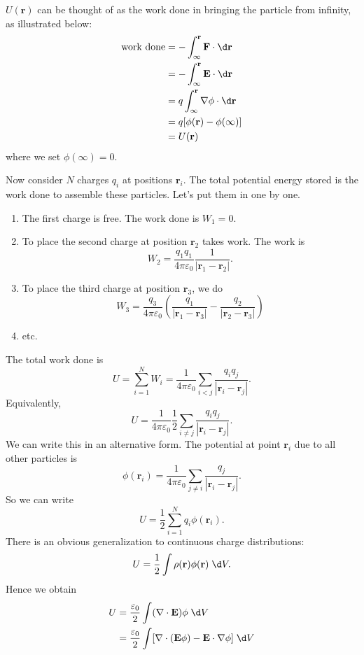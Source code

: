 \documentclass[a4paper]{article}
\begin{document}
$U(\mathbf{r})$ can be thought of as the work done in bringing the particle from infinity, as illustrated below:
\begin{align*}
  \text{work done} &= -\int_\infty^\mathbf{r} \mathbf{F}\cdot \d \mathbf{r}\\
  &= -\int_\infty^\mathbf{r}\mathbf{E}\cdot \d \mathbf{r} \\
  &= q\int_\infty^\mathbf{r} \nabla \mathbf{\phi}\cdot \d \mathbf{r}\\
  &= q[\phi(\mathbf{r}) - \phi(\infty)]\\
  &= U(\mathbf{r})
\end{align*}
where we set $\phi(\infty) = 0$.

Now consider $N$ charges $q_i$ at positions $\mathbf{r}_i$. The total potential energy stored is the work done to assemble these particles. Let's put them in one by one.
\begin{enumerate}
  \item The first charge is free. The work done is $W_1 = 0$.
  \item To place the second charge at position $\mathbf{r}_2$ takes work. The work is
    \[
      W_2 = \frac{q_1q_1}{4\pi\varepsilon_0}\frac{1}{|\mathbf{r}_1 - \mathbf{r}_2|}.
    \]
  \item To place the third charge at position $\mathbf{r}_3$, we do
    \[
      W_3 = \frac{q_3}{4\pi\varepsilon_0}\left(\frac{q_1}{|\mathbf{r}_1 - \mathbf{r}_3|} - \frac{q_2}{|\mathbf{r}_2 - \mathbf{r}_3|}\right)
    \]
  \item etc.
\end{enumerate}
The total work done is
\[
  U = \sum_{i = 1}^N W_i = \frac{1}{4\pi\varepsilon_0} \sum_{i < j} \frac{q_iq_j}{|\mathbf{r}_i - \mathbf{r}_j|}.
\]
Equivalently,
\[
  U = \frac{1}{4\pi\varepsilon_0} \frac{1}{2} \sum_{i \not= j} \frac{q_iq_j}{|\mathbf{r}_i - \mathbf{r}_j|}.
\]
We can write this in an alternative form. The potential at point $\mathbf{r}_i$ due to all other particles is
\[
  \phi(\mathbf{r}_i) = \frac{1}{4\pi\varepsilon_0}\sum_{j\not= i}\frac{q_j}{|\mathbf{r}_i - \mathbf{r}_j|}.
\]
So we can write
\[
  U = \frac{1}{2}\sum_{i = 1}^N q_i \phi(\mathbf{r}_i).
\]
There is an obvious generalization to continuous charge distributions:
\[
  U = \frac{1}{2} \int \rho (\mathbf{r}) \phi(\mathbf{r}) \;\d V.
\]
Hence we obtain
\begin{align*}
  U &= \frac{\varepsilon_0}{2}\int (\nabla\cdot \mathbf{E}) \phi \;\d V\\
  &= \frac{\varepsilon_0}{2}\int [\nabla\cdot (\mathbf{E}\phi) - \mathbf{E}\cdot \nabla \phi]\;\d V
\end{align*}
\end{document}
